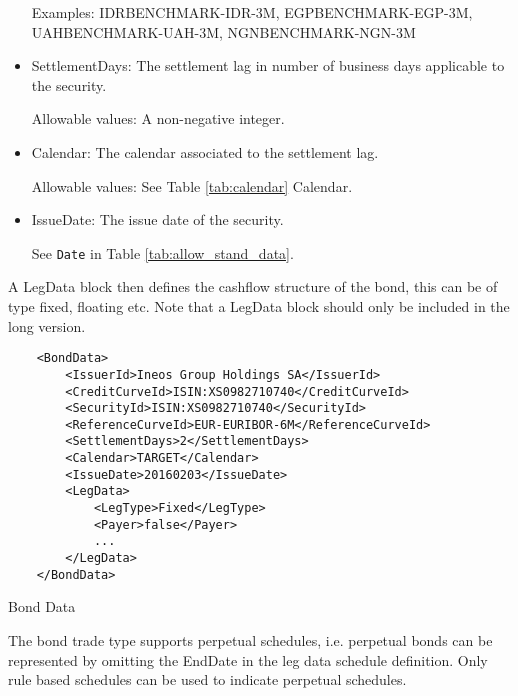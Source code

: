 \begin{itemize}
Examples: IDRBENCHMARK-IDR-3M, EGPBENCHMARK-EGP-3M, UAHBENCHMARK-UAH-3M, NGNBENCHMARK-NGN-3M
 
\item SettlementDays: The settlement lag in number of business days applicable to the security.

Allowable values: A non-negative integer.

\item Calendar: The calendar associated to the settlement lag.

Allowable values: See Table \ref{tab:calendar} Calendar.

\item IssueDate: The issue date of the security.

See \lstinline!Date! in Table \ref{tab:allow_stand_data}.

\end{itemize}

A LegData block then defines the cashflow structure of the bond, this can be of type fixed, floating etc. Note that a LegData block should only be included in the long version. 

\begin{listing}[H]
\begin{verbatim}
    <BondData>
        <IssuerId>Ineos Group Holdings SA</IssuerId>
        <CreditCurveId>ISIN:XS0982710740</CreditCurveId>
        <SecurityId>ISIN:XS0982710740</SecurityId>
        <ReferenceCurveId>EUR-EURIBOR-6M</ReferenceCurveId>
        <SettlementDays>2</SettlementDays>
        <Calendar>TARGET</Calendar>
        <IssueDate>20160203</IssueDate>
        <LegData>
            <LegType>Fixed</LegType>
            <Payer>false</Payer>
            ...
        </LegData>
    </BondData>
\end{verbatim}
\caption{Bond Data}
\label{lst:bonddata}
\end{listing}

The bond trade type supports perpetual schedules, i.e. perpetual bonds can be represented by omitting the EndDate in the
leg data schedule definition. Only rule based schedules can be used to indicate perpetual schedules.

